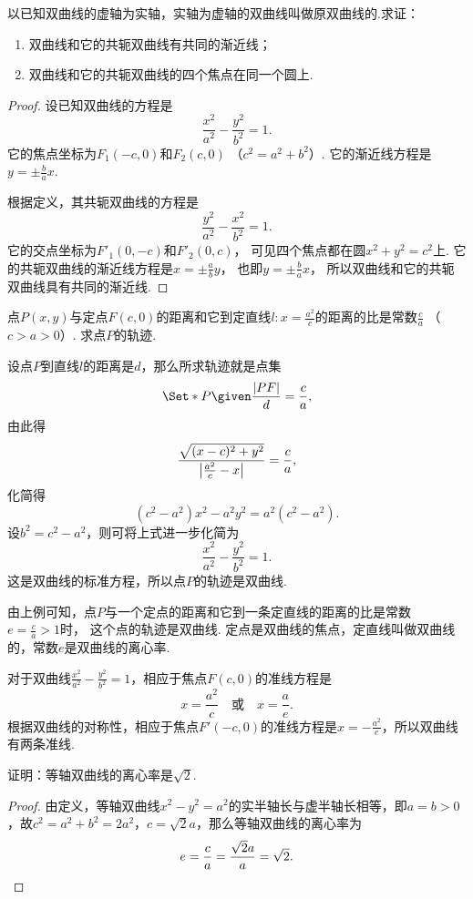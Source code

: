 \begin{example}
以已知双曲线的虚轴为实轴，实轴为虚轴的双曲线叫做原双曲线的.求证：\begin{enumerate}
\item 双曲线和它的共轭双曲线有共同的渐近线；
\item 双曲线和它的共轭双曲线的四个焦点在同一个圆上.
\end{enumerate}
\begin{proof}
设已知双曲线的方程是\[
	\frac{x^2}{a^2}-\frac{y^2}{b^2}=1.
\]
它的焦点坐标为\(F_1(-c,0)\)和\(F_2(c,0)\)
（\(c^2=a^2+b^2\)）.
它的渐近线方程是\(y=\pm\frac{b}{a}x\).

根据定义，其共轭双曲线的方程是\[
\frac{y^2}{a^2}-\frac{x^2}{b^2}=1.
\]它的交点坐标为\(F'_1(0,-c)\)和\(F'_2(0,c)\)，
可见四个焦点都在圆\(x^2+y^2=c^2\)上.
它的共轭双曲线的渐近线方程是\(x=\pm\frac{a}{b}y\)，
也即\(y=\pm\frac{b}{a}x\)，
所以双曲线和它的共轭双曲线具有共同的渐近线.
\end{proof}
\end{example}

\begin{example}
点\(P(x,y)\)与定点\(F(c,0)\)的距离和它到定直线\(l: x = \frac{a^2}{c}\)的距离的比是常数\(\frac{c}{a}\)
（\(c > a > 0\)）.
求点\(P\)的轨迹.
\begin{solution}
设点\(P\)到直线\(l\)的距离是\(d\)，那么所求轨迹就是点集\[
\Set*{ P \given \frac{\abs{PF}}{d} = \frac{c}{a} },
\]由此得\[
\frac{\sqrt{(x-c)^2+y^2}}{\abs{\frac{a^2}{c}-x}} = \frac{c}{a},
\]化简得\[
(c^2-a^2)x^2 - a^2 y^2 = a^2(c^2-a^2).
\]设\(b^2=c^2-a^2\)，则可将上式进一步化简为\[
\frac{x^2}{a^2}-\frac{y^2}{b^2}=1.
\]这是双曲线的标准方程，所以点\(P\)的轨迹是双曲线.
\end{solution}

由上例可知，点\(P\)与一个定点的距离和它到一条定直线的距离的比是常数
\(e = \frac{c}{a} > 1\)时，
这个点的轨迹是双曲线.
定点是双曲线的焦点，定直线叫做双曲线的，常数\(e\)是双曲线的离心率.

对于双曲线\(\frac{x^2}{a^2}-\frac{y^2}{b^2}=1\)，相应于焦点\(F(c,0)\)的准线方程是\[
x = \frac{a^2}{c}
\quad\text{或}\quad
x = \frac{a}{e}.
\]根据双曲线的对称性，相应于焦点\(F'(-c,0)\)的准线方程是\(x=-\frac{a^2}{c}\)，所以双曲线有两条准线.
\end{example}

\begin{example}
证明：等轴双曲线的离心率是\(\sqrt2\).
\begin{proof}
由定义，等轴双曲线\(x^2-y^2=a^2\)的实半轴长与虚半轴长相等，即\(a=b>0\)，故\(c^2 = a^2 + b^2 = 2 a^2\)，\(c = \sqrt2 a\)，那么等轴双曲线的离心率为\[
e = \frac{c}{a} = \frac{\sqrt2 a}{a} = \sqrt2.
\qedhere
\]
\end{proof}
\end{example}

